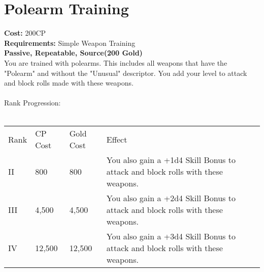 \section{Polearm Training}\label{perk:polearmTraining}
\textbf{Cost:} 200CP\\
\textbf{Requirements:} Simple Weapon Training\\
\textbf{Passive, Repeatable, Source(200 Gold)}\\
You are trained with polearms.
This includes all weapons that have the "Polearm" and without the "Unusual" descriptor.
You add your level to attack and block rolls made with these weapons.\\
\\
Rank Progression:\\
\\
\begin{longtable}{l | l | l | p{9cm}}
	Rank & CP Cost & Gold Cost & Effect\\
	II & 800 & 800 & You also gain a +1d4 Skill Bonus to attack and block rolls with these weapons.\\
	III & 4,500 & 4,500 & You also gain a +2d4 Skill Bonus to attack and block rolls with these weapons.\\
	IV & 12,500 & 12,500 & You also gain a +3d4 Skill Bonus to attack and block rolls with these weapons.\\
\end{longtable}